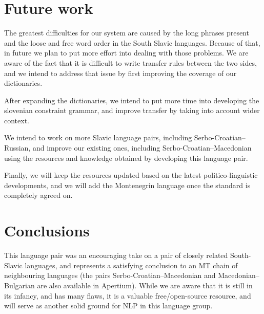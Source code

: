 \section{Future work}

The greatest difficulties for our system are caused by the long phrases present 
and the loose and free word order in the South Slavic languages.
Because of that, in future we plan to put more effort into dealing with those problems.
We are aware of the fact that it is difficult to write transfer rules between the two sides,
and we intend to address that issue by first improving the coverage of our dictionaries.

After expanding the dictionaries, we intend to put more time into developing the slovenian constraint grammar,
and improve transfer by taking into account wider context.

We intend to work on more Slavic language pairs, including Serbo-Croatian--Russian,
and improve our existing ones, including Serbo-Croatian--Macedonian \citep{peradin12} using the 
resources and knowledge obtained by developing this language pair.

Finally, we will keep the resources updated based on the latest politico-linguistic developments,
and we will add the Montenegrin language once the standard is completely agreed on.



\section{Conclusions}

This language pair was an encouraging take on a pair of closely
related South-Slavic languages, and represents a satisfying conclusion
to an MT chain of neighbouring languages (the pairs Serbo-Croatian--Macedonian 
and Macedonian--Bulgarian are also available in Apertium). While we are aware that it
is still in its infancy, and has many flaws, it is a valuable
free/open-source resource, and will serve as another solid ground for NLP
in this language group.

